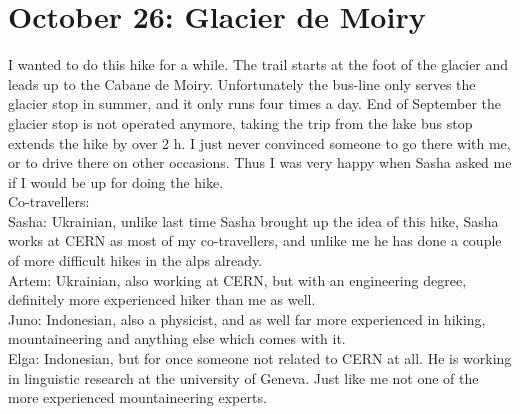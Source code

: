 \section{October 26: Glacier de Moiry}
\label{2019:Moiry}

I wanted to do this hike for a while. The trail starts at the foot of the glacier and leads up to the Cabane de Moiry. Unfortunately the bus-line only serves the glacier stop in summer, and it only runs four times a day. End of September the glacier stop is not operated anymore, taking the trip from the lake bus stop extends the hike by over 2 h. I just never convinced someone to go there with me, or to drive there on other occasions. Thus I was very happy when Sasha asked me if I would be up for doing the hike.\\

Co-travellers:\\
Sasha: Ukrainian, unlike last time Sasha brought up the idea of this hike, Sasha works at CERN as most of my co-travellers, and unlike me he has done a couple of more difficult hikes in the alps already. \\

Artem: Ukrainian, also working at CERN, but with an engineering degree, definitely more experienced hiker than me as well.\\

Juno: Indonesian, also a physicist, and as well far more experienced in hiking, mountaineering and anything else which comes with it.\\

Elga: Indonesian, but for once someone not related to CERN at all. He is working in linguistic research at the university of Geneva. Just like me not one of the more experienced mountaineering experts.\\

